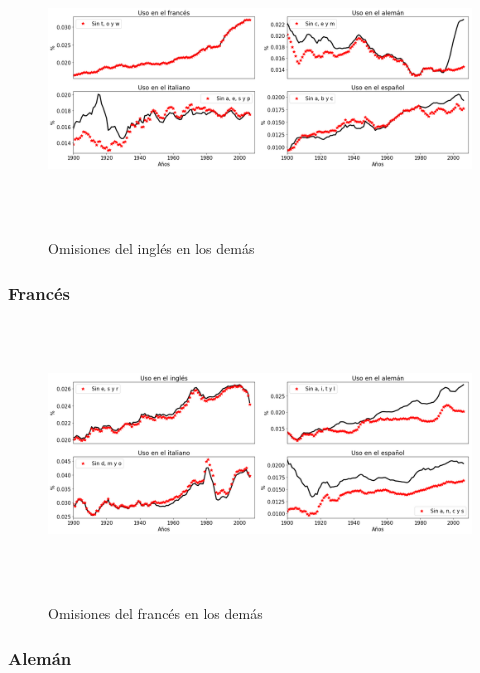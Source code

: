 \begin{figure}[h!]
	\centering
	\includegraphics[width=14.5cm, height=7cm]{Cap_5/OM_EN.png}
	\label{fig.OM_EN}
	\caption{Omisiones del inglés en los demás}
\end{figure}

\newpage
\subsubsection*{Francés}

\begin{figure}[h!]
	\centering
	\includegraphics[width=14.5cm, height=7cm]{Cap_5/OM_FR.png}
	\label{fig.OM_FR}
	\caption{Omisiones del francés en los demás}
\end{figure}



\subsubsection*{Alemán}

